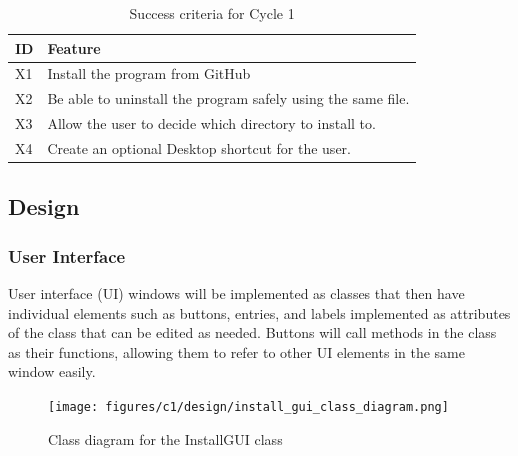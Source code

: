\documentclass[11pt]{article}
\begin{document}
                \begin{table}[!ht]
                    \centering
                    \begin{tabular}{m{16pt}m{}}
                        ID & Feature \\ \hline
                        X1 & Install the program from GitHub \\ 
                        X2 & Be able to uninstall the program safely using the same file. \\ 
                        X3 & Allow the user to decide which directory to install to. \\ 
                        X4 & Create an optional Desktop shortcut for the user. \\ 
                    \end{tabular}
                    \caption{Success criteria for Cycle 1}
                    \label{tbl:succ_crit_c1}
                \end{table}

                
        \subsection{Design}

            \subsubsection{User Interface}
                User interface (UI) windows will be implemented as classes that then have individual elements such as buttons, entries, and labels implemented as attributes of the class that can be edited as needed. Buttons will call methods in the class as their functions, allowing them to refer to other UI elements in the same window easily.

                \begin{figure}[!ht]
                    \centering
                    \texttt{[image: figures/c1/design/install\_gui\_class\_diagram.png]}
                    \caption{Class diagram for the InstallGUI class}
                    \label{fig:install_gui_class_diagram_c1}
                \end{figure}
\end{document}
